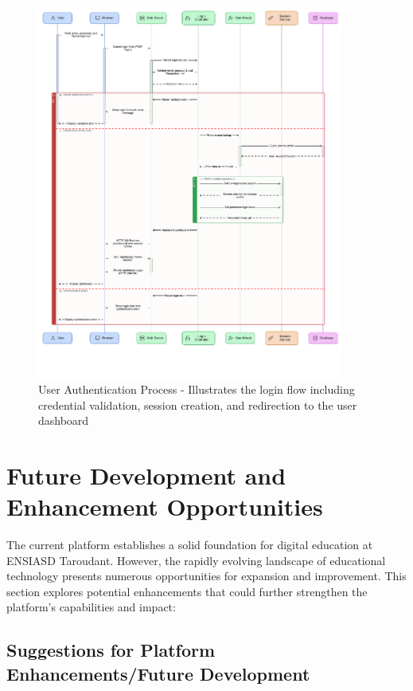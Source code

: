 \documentclass[12pt,a4paper]{article}
\begin{document}
\begin{itemize}
    \begin{figure}[!htbp]
        \centering
        \includegraphics[width=0.9\textwidth]{user-authentication.png}
        \caption{User Authentication Process - Illustrates the login flow including credential validation, session creation, and redirection to the user dashboard}
        \label{fig:user-authentication}
    \end{figure}
    \FloatBarrier
\end{itemize}

\section{Future Development and Enhancement Opportunities}

The current platform establishes a solid foundation for digital education at ENSIASD Taroudant. However, the rapidly evolving landscape of educational technology presents numerous opportunities for expansion and improvement. This section explores potential enhancements that could further strengthen the platform's capabilities and impact:

\subsection{Suggestions for Platform Enhancements/Future Development}
\end{document}
